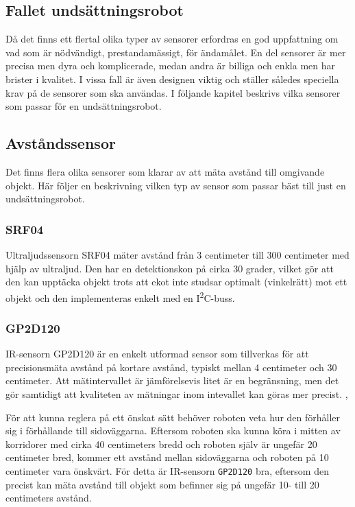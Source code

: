 \documentclass[11pt]{article}
\begin{document}
\begin{flushleft}
\pagebreak
\section{Fallet undsättningsrobot}
Då det finns ett flertal olika typer av sensorer erfordras en god uppfattning om vad som är nödvändigt, prestandamässigt, för ändamålet. En del sensorer är mer precisa men dyra och komplicerade, medan andra är billiga och enkla men har brister i kvalitet. I vissa fall är även designen viktig och ställer således speciella krav på de sensorer som ska användas. I följande kapitel beskrivs vilka sensorer som passar för en undsättningsrobot. 

\subsection{Avståndssensor}
Det finns flera olika sensorer som klarar av att mäta avstånd till omgivande objekt. Här följer en beskrivning vilken typ av sensor som passar bäst till just en undsättningsrobot. 

\subsubsection{SRF04} %
Ultraljudssensorn SRF04 mäter avstånd från 3 centimeter till 300 centimeter med hjälp av ultraljud. Den har en detektionskon på cirka 30 grader, vilket gör att den kan upptäcka objekt trots att ekot inte studsar optimalt (vinkelrätt) mot ett objekt och den implementeras enkelt med en I\textsuperscript{2}C-buss. \cite{Devantech}

\subsubsection{GP2D120} %
IR-sensorn GP2D120 är en enkelt utformad sensor som tillverkas för att precisionsmäta avstånd på kortare avstånd, typiskt mellan 4 centimeter och 30 centimeter. Att mätintervallet är jämförelsevis litet är en begränsning, men det gör samtidigt att kvaliteten av mätningar inom intevallet kan göras mer precist. \cite{website:cmu}, \cite{Sharp}

För att kunna reglera på ett önskat sätt behöver roboten veta hur den förhåller sig i förhållande till sidoväggarna. Eftersom roboten ska kunna köra i mitten av korridorer med cirka 40 centimeters bredd och roboten själv är ungefär 20 centimeter bred, kommer ett avstånd mellan sidoväggarna och roboten på 10 centimeter vara önskvärt. För detta är IR-sensorn \verb+GP2D120+ bra, eftersom den precist kan mäta avstånd till objekt som befinner sig på ungefär 10- till 20 centimeters avstånd.


\end{flushleft}
\end{document}
